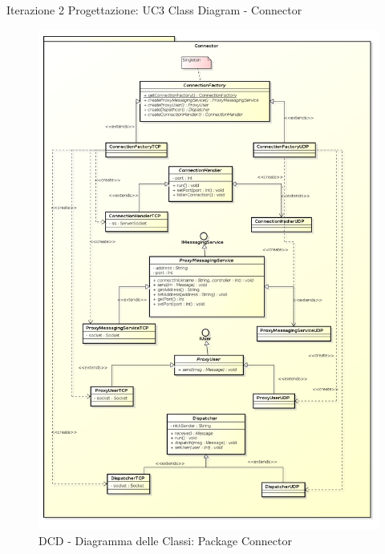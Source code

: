 \documentclass[t]{beamer} %
\begin{document}
\begin{frame} {Iterazione 2 Progettazione: UC3 Class Diagram - Connector}
   \begin{figure}
     \includegraphics[scale=0.125]{image_astah/Iteration_2_DesignModel/ClassDiagramConnector.png}{\centering}
     \caption{DCD - Diagramma delle Classi: Package Connector }
     \label{fig_UC3_DCD_4} 
   \end{figure}
\end{frame}
\end{document}
